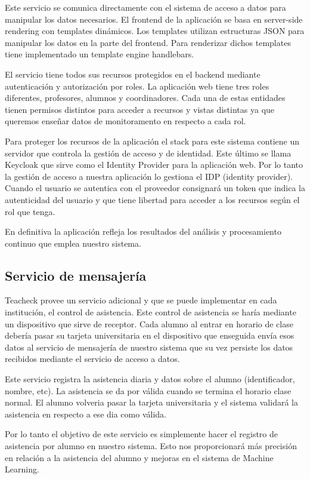Este servicio se comunica directamente con el sistema de acceso a datos para manipular los datos necesarios. El frontend de la aplicación se basa en server-side rendering con templates dinámicos. Los templates utilizan estructuras JSON para manipular los datos en la parte del frontend. Para renderizar dichos templates tiene implementado un template engine handlebars. 

El servicio tiene todos sus recursos protegidos en el backend mediante autenticación y autorización por roles. La aplicación web tiene tres roles diferentes, profesores, alumnos y coordinadores. Cada una de estas entidades tienen permisos distintos para acceder a recursos y vistas distintas ya que queremos enseñar datos de monitoramento en respecto a cada rol.

Para proteger los recursos de la aplicación el stack para este sistema contiene un servidor que controla la gestión de acceso y de identidad. Este último se llama Keycloak que sirve como el Identity Provider para la aplicación web. Por lo tanto la gestión de acceso a nuestra aplicación lo gestiona el IDP (identity provider). Cuando el usuario se autentica con el proveedor consignará un token que indica la autenticidad del usuario y que tiene libertad para acceder a los recursos según el rol que tenga. 

En definitiva la aplicación refleja los resultados del análisis y procesamiento continuo que emplea nuestro sistema.

\subsection{Servicio de mensajería}

Teacheck provee un servicio adicional y que se puede implementar en cada institución, el control de asistencia. Este control de asistencia se haría mediante un dispositivo que sirve de receptor. Cada alumno al entrar en horario de clase debería pasar su tarjeta universitaria en el dispositivo que enseguida envía esos datos al servicio de mensajería de nuestro sistema que su vez persiste los datos recibidos mediante el servicio de acceso a datos. 

Este servicio registra la asistencia diaria y datos sobre el alumno (identificador, nombre, etc).
La asistencia se da por válida cuando se termina el horario clase normal. El alumno volveria pasar la tarjeta universitaria y el sistema validará la asistencia en respecto a ese dia como válida.

Por lo tanto el objetivo de este servicio es simplemente hacer el registro de asistencia por alumno en nuestro sistema. Esto nos proporcionará más precisión en relación a la asistencia del alumno y mejoras en el sistema de Machine Learning.

